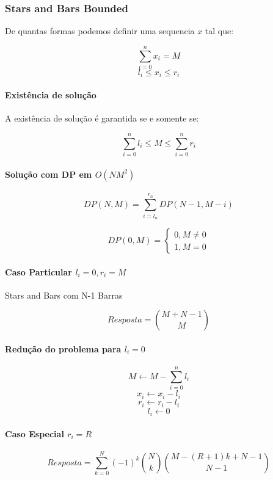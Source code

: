 \subsubsection{Stars and Bars Bounded}

De quantas formas podemos definir uma sequencia $x$ tal que:

$$ \sum^{n}_{i=0} x_i = M $$
$$ l_i \leq x_i \leq r_i $$

\paragraph{Existência de solução}

A existência  de solução é garantida se e somente se:

$$ \sum^{n}_{i=0} l_i \leq M \leq \sum^{n}_{i=0} r_i $$

\paragraph{Solução com DP em $ O(NM^2) $}

$$ DP(N, M) = \sum^{r_n}_{i=l_n} DP(N-1, M-i) $$

$$
DP(0, M) =
    \begin{cases}
        0, M \neq 0 \\
        1, M = 0
    \end{cases}
$$

\paragraph{Caso Particular $ l_i = 0 , r_i = M$}

Stars and Bars com N-1 Barras

$$ Resposta = \binom{M+N-1}{M} $$

\paragraph{Redução do problema para $l_i = 0$}

$$ M \xleftarrow{} M - \sum^{n}_{i=0} l_i $$
$$ x_i \xleftarrow{} x_i - l_i $$
$$ r_i \xleftarrow{} r_i - l_i $$
$$ l_i \xleftarrow{} 0 $$

\paragraph{Caso Especial $ r_i = R $}

$$ Resposta = \sum^{N}_{k=0} (-1)^k \binom{N}{k} \binom{M - (R + 1) k + N - 1}{N-1} $$

